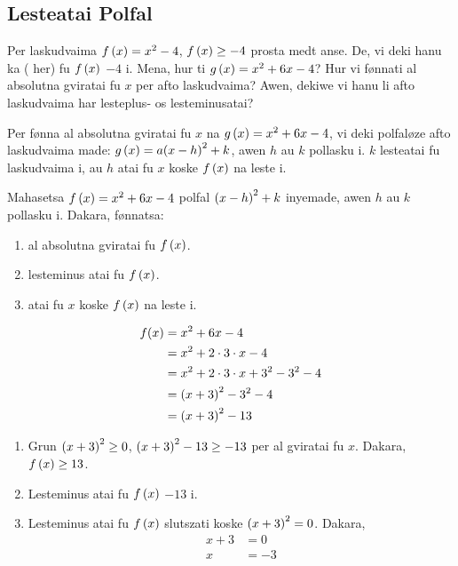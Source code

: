 \subsection{Lesteatai Polfal}
Per laskudvaima \(f \left(x\right) = x^2 - 4\), \(f\left(x\right) \geq - 4\) prosta medt anse. De, vi deki hanu
ka  ( her) fu \(f\left(x\right)\) \(-4\) i. Mena, hur ti
\(g \left(x\right) = x^2+6x-4\)? Hur vi fønnati al absolutna gviratai fu \(x\) per afto laskudvaima?
Awen, dekiwe vi hanu li afto laskudvaima har lesteplus- os lesteminusatai?

Per fønna al absolutna gviratai fu \(x\) na \(g \left(x\right)=x^2+6x-4\), vi deki polfaløze afto
laskudvaima  made: \(g \left(x\right) = a{\left(x-h\right)}^2+k\), awen
\(h\) au \(k\) pollasku i. \(k\) lesteatai fu laskudvaima i, au \(h\) atai fu \(x\) koske \(f \left(x\right)\)
na leste i.

\begin{tatoeba}
  Mahasetsa \(f \left(x\right)=x^2+6x-4\) polfal \({\left(x-h\right)}^2+k\) inyemade,
  awen \(h\) au \(k\) pollasku i. Dakara, fønnatsa:
  \begin{enumerate}
    \item al absolutna gviratai fu \(f \left(x\right)\).
    \item lesteminus atai fu \(f \left(x\right)\).
    \item atai fu \(x\) koske \(f \left(x\right)\) na leste i.
  \end{enumerate}
\end{tatoeba}

\begin{svarna}
  \begin{align*}
    f(x) &= x^2 + 6x - 4 \\
    &= x^2 + 2 \cdot 3 \cdot x - 4 \\
    &= x^2 + 2 \cdot 3 \cdot x + 3^2 - 3^2 - 4 \\
    &= {\left(x+3\right)}^2 - 3^2 - 4 \\
    &= {\left(x+3\right)}^2 - 13 \\
  \end{align*}
  \begin{enumerate}
    \item Grun \({\left(x+3\right)}^2\geq0\), \({\left(x+3\right)}^2-13\geq-13\) per al gviratai fu \(x\). Dakara, \(f \left(x\right)\geq13\).
    \item Lesteminus atai fu \(f \left(x\right)\) \(-13\) i.
    \item Lesteminus atai fu \(f \left(x\right)\) slutszati koske \({\left(x+3\right)}^2=0\). Dakara,
  \begin{align*}
    x + 3 &= 0 \\
    x &= -3
  \end{align*}
  \end{enumerate}
\end{svarna}

